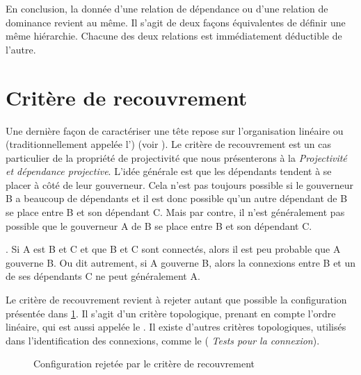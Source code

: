 {    En conclusion, la donnée d’une relation de dépendance ou d’une relation de dominance revient au même. Il s’agit de deux façons équivalentes de définir une même hiérarchie. Chacune des deux relations est immédiatement déductible de l’autre.
}

\section{Critère de recouvrement}\label{sec:3.3.32}

Une dernière façon de caractériser une tête repose sur l’organisation linéaire ou  (traditionnellement appelée l’) (voir ). Le critère de recouvrement est un cas particulier de la propriété de projectivité que nous présenterons à la  \textit{Projectivité et dépendance projective}. L’idée générale est que les dépendants tendent à se placer à côté de leur gouverneur. Cela n’est pas toujours possible si le gouverneur B a beaucoup de dépendants et il est donc possible qu’un autre dépendant de B se place entre B et son dépendant C. Mais par contre, il n’est généralement pas possible que le gouverneur A de B se place entre B et son dépendant C.

{. Si A est  B et C et que B et C sont connectés, alors il est peu probable que A gouverne B. Ou dit autrement, si A gouverne B, alors la connexions entre B et un de ses dépendants C ne peut généralement  A.}

Le critère de recouvrement revient à rejeter autant que possible la configuration présentée dans \ref{fig:recouvrement}. Il s'agit d'un critère topologique, prenant en compte l'ordre linéaire, 
qui est aussi appelée le . Il existe d'autres critères topologiques, utilisés dans l'identification des connexions, comme le  ( \textit{Tests pour la connexion}).

\begin{figure}
\caption{\label{fig:recouvrement}Configuration rejetée par le critère de recouvrement}
\end{figure}


